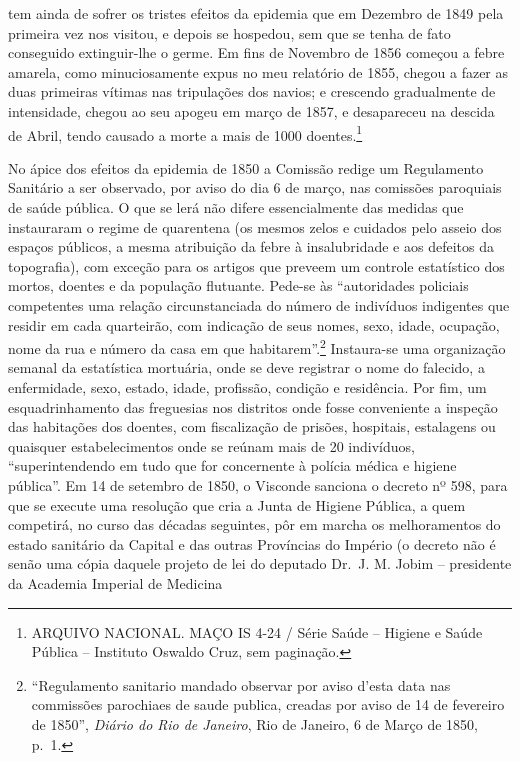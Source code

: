 tem ainda de sofrer os tristes efeitos da epidemia que em Dezembro de
1849 pela primeira vez nos visitou, e depois se hospedou, sem que se
tenha de fato conseguido extinguir-lhe o germe. Em fins de Novembro de
1856 começou a febre amarela, como minuciosamente expus no meu relatório
de 1855, chegou a fazer as duas primeiras vítimas nas tripulações dos
navios; e crescendo gradualmente de intensidade, chegou ao seu apogeu em
março de 1857, e desapareceu na descida de Abril, tendo causado a morte
a mais de 1000 doentes.\footnote{ARQUIVO NACIONAL. MAÇO IS 4-24 / Série
  Saúde -- Higiene e Saúde Pública -- Instituto Oswaldo Cruz, sem
  paginação.}

No ápice dos efeitos da epidemia de 1850 a Comissão redige um
Regulamento Sanitário a ser observado, por aviso do dia 6 de março, nas
comissões paroquiais de saúde pública. O que se lerá não difere
essencialmente das medidas que instauraram o regime de quarentena (os
mesmos zelos e cuidados pelo asseio dos espaços públicos, a mesma
atribuição da febre à insalubridade e aos defeitos da topografia), com
exceção para os artigos que preveem um controle estatístico dos mortos,
doentes e da população flutuante. Pede-se às ``autoridades policiais
competentes uma relação circunstanciada do número de indivíduos
indigentes que residir em cada quarteirão, com indicação de seus nomes,
sexo, idade, ocupação, nome da rua e número da casa em que
habitarem''.\footnote{``Regulamento sanitario mandado observar por aviso
  d'esta data nas commissões parochiaes de saude publica, creadas por
  aviso de 14 de fevereiro de 1850'', \emph{Diário do Rio de Janeiro},
  Rio de Janeiro, 6 de Março de 1850, p.~1.} Instaura-se uma organização
semanal da estatística mortuária, onde se deve registrar o nome do
falecido, a enfermidade, sexo, estado, idade, profissão, condição e
residência. Por fim, um esquadrinhamento das freguesias nos distritos
onde fosse conveniente a inspeção das habitações dos doentes, com
fiscalização de prisões, hospitais, estalagens ou quaisquer
estabelecimentos onde se reúnam mais de 20 indivíduos, ``superintendendo
em tudo que for concernente à polícia médica e higiene pública''. Em 14
de setembro de 1850, o Visconde sanciona o decreto nº 598, para que se
execute uma resolução que cria a Junta de Higiene Pública, a quem
competirá, no curso das décadas seguintes, pôr em marcha os
melhoramentos do estado sanitário da Capital e das outras Províncias do
Império (o decreto não é senão uma cópia daquele projeto de lei do
deputado Dr.~J. M. Jobim -- presidente da Academia Imperial de Medicina
